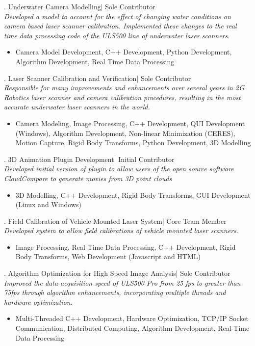 \documentclass[10pt,letterpaper]{resume}
\begin{document}
\entry . Underwater Camera Modelling| Sole Contributor
\textit{\\Developed a model to account for the effect of changing water conditions on camera based laser scanner calibration. Implemented these changes to the real time data processing code of the ULS500 line of underwater laser scanners. }
\begin {itemize}
\item Camera Model Development, C++ Development, Python Development, Algorithm Development, Real Time Data Processing
\end {itemize}

\entry . Laser Scanner Calibration and Verification| Sole Contributor
\textit{\\Responsible for many improvements and enhancements over several years in 2G Robotics laser scanner and camera calibration procedures, resulting in the most accurate underwater laser scanners in the world.}
\begin {itemize}
\item Camera Modeling, Image Processing, C++ Development, QUI Development (Windows), Algorithm Development, Non-linear Minimization (CERES), Motion Capture, Rigid Body Transforms, Python Development, 3D Modelling
\end {itemize}

\entry . 3D Animation Plugin Development| Initial Contributor
\textit{\\Developed initial version of plugin to allow users of the open source software CloudCompare to generate movies from 3D point clouds}
\begin {itemize}
\item 3D Modelling, C++ Development, Rigid Body Transforms, GUI Development (Linux and Windows)
\end {itemize}

\entry . Field Calibration of Vehicle Mounted Laser System| Core Team Member
\textit{\\Developed system to allow field calibrations of vehicle mounted laser scanners.}
\begin {itemize}
\item Image Processing, Real Time Data Processing, C++ Development, Rigid Body Transforms, Web Development (Javascript and HTML)
\end {itemize}

\entry . Algorithm Optimization for High Speed Image Analysis| Sole Contributor
\textit{\\Improved the data acquisition speed of ULS500 Pro from 25 fps to greater than 75fps through algorithm enhancements, incorporating multiple threads and hardware optimization.}
\begin {itemize}
\item Multi-Threaded C++ Development, Hardware Optimization, TCP/IP Socket Communication, Distributed Computing, Algorithm Development, Real-Time Data Processing
\end {itemize}
\end{document}
